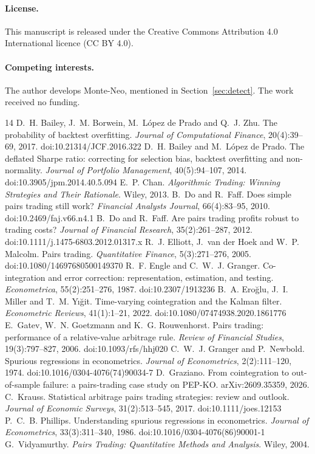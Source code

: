 \documentclass[11pt]{article}
\theoremstyle{remark}
\begin{document}
\paragraph{License.} This manuscript is released under the Creative Commons Attribution 4.0 International licence (CC BY 4.0).

\paragraph{Competing interests.} The author develops Monte-Neo, mentioned in Section~\ref{sec:detect}. The work received no
funding.

\begin{thebibliography}{14}
 D.~H. Bailey, J.~M. Borwein, M.~L\'opez de Prado and Q.~J. Zhu. The probability of
backtest overfitting. \emph{Journal of Computational Finance}, 20(4):39--69, 2017. doi:10.21314/JCF.2016.322
 D.~H. Bailey and M.~L\'opez de Prado. The deflated Sharpe ratio: correcting for
selection bias, backtest overfitting and non-normality. \emph{Journal of Portfolio Management}, 40(5):94--107, 2014. doi:10.3905/jpm.2014.40.5.094
 E.~P. Chan. \emph{Algorithmic Trading: Winning Strategies and Their Rationale}. Wiley, 2013.
 B.~Do and R.~Faff. Does simple pairs trading still work? \emph{Financial Analysts Journal}, 66(4):83--95, 2010. doi:10.2469/faj.v66.n4.1
 B.~Do and R.~Faff. Are pairs trading profits robust to trading costs? \emph{Journal of Financial Research}, 35(2):261--287, 2012. doi:10.1111/j.1475-6803.2012.01317.x
 R.~J. Elliott, J.~van der Hoek and W.~P. Malcolm. Pairs trading. \emph{Quantitative Finance}, 5(3):271--276, 2005. doi:10.1080/14697680500149370
 R.~F. Engle and C.~W.~J. Granger. Co-integration and error correction: representation, estimation, and testing. \emph{Econometrica}, 55(2):251--276, 1987. doi:10.2307/1913236
 B.~A. Ero\u{g}lu, J.~I. Miller and T.~M. Y\i\u{g}it. Time-varying cointegration and the Kalman
filter. \emph{Econometric Reviews}, 41(1):1--21, 2022. doi:10.1080/07474938.2020.1861776
 E.~Gatev, W.~N. Goetzmann and K.~G. Rouwenhorst. Pairs trading: performance of a
relative-value arbitrage rule. \emph{Review of Financial Studies}, 19(3):797--827, 2006. doi:10.1093/rfs/hhj020
 C.~W.~J. Granger and P.~Newbold. Spurious regressions in econometrics. \emph{Journal of
Econometrics}, 2(2):111--120, 1974. doi:10.1016/0304-4076(74)90034-7
 D.~Graziano. From cointegration to out-of-sample failure: a pairs-trading case study on PEP-KO. arXiv:2609.35359, 2026.
 C.~Krauss. Statistical arbitrage pairs trading strategies: review and outlook. \emph{Journal of
Economic Surveys}, 31(2):513--545, 2017. doi:10.1111/joes.12153
 P.~C.~B. Phillips. Understanding spurious regressions in econometrics. \emph{Journal of
Econometrics}, 33(3):311--340, 1986. doi:10.1016/0304-4076(86)90001-1
 G.~Vidyamurthy. \emph{Pairs Trading: Quantitative Methods and Analysis}. Wiley, 2004.
\end{thebibliography}
\end{document}
